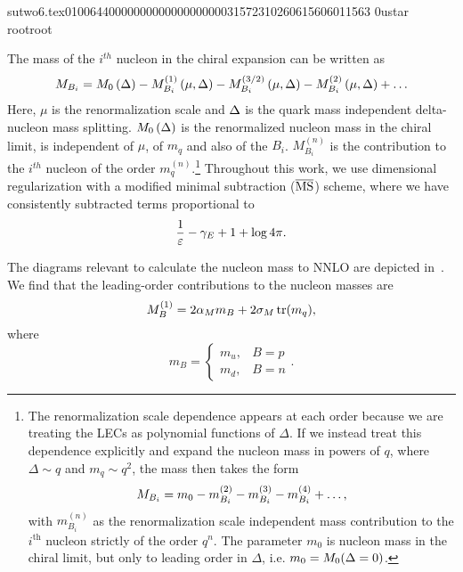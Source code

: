                                                                                                                                                                                                                                                                                       sutwo6.tex                                                                                          0100644 0000000 0000000 00000315723 10260615606 011563  0                                                                                                    ustar   root                            root                                                                                                                                                                                                                   \documentclass[prd,amssymb,amsmath,showpacs,nofootinbib,superscriptaddress]{revtex4}
\begin{document}
The mass of the $i^{th}$ nucleon in the chiral expansion can be written as
\begin{eqnarray}\label{eq:NucMassExp}
     M_{B_i} = M_0 \left({\Delta} \right) -  M_{B_i}^{(1)}\left(\mu, {\Delta} \right)
                - M_{B_i}^{(3/2)}\left(\mu, {\Delta} \right)
                - M_{B_i}^{(2)}\left(\mu, {\Delta} \right) + \ldots
\label{eq:Bmassexp}
\end{eqnarray}
Here, $\mu$ is the renormalization scale and ${\Delta}$ is the quark mass independent delta-nucleon mass splitting.  $M_0 \left({\Delta} \right)$ is the renormalized nucleon
mass in the chiral limit, is independent of $\mu$, of $m_q$ and also of the $B_i$.  $M_{B_i}^{(n)}$ is the contribution to the $i^{th}$ nucleon of the order $m_q^{(n)}$.\footnote{%
The renormalization scale dependence appears at each order because we are 
treating the LECs as polynomial functions of $\Delta$. If we instead
treat this dependence explicitly and expand the nucleon mass in powers of 
$q$, where $\Delta \sim q$ and $ m_q \sim q^2$, the mass then takes the form
\begin{eqnarray}
M_{B_i} 
= m_0  -  m_{B_i}^{(2)} - m_{B_i}^{(3)} - m_{B_i}^{(4)} + \ldots
\notag,\end{eqnarray}
with $m_{B_i}^{(n)}$ as the renormalization scale independent mass contribution 
to the $i^{\text{th}}$ nucleon strictly of the order $q^n$. The parameter $m_0$ is
nucleon mass in the chiral limit, but only to leading order in $\Delta$, i.e. $m_0 = M_0({\Delta}=0)$.
}
Throughout this work, we use dimensional 
regularization with a modified minimal subtraction (${\overline{\rm   MS}}$) 
scheme, where we have consistently subtracted terms proportional to 
\begin{equation}
\frac{1}{\varepsilon} - \gamma_E + 1 + \log 4 \pi
\notag 
.\end{equation}

The diagrams relevant to calculate the nucleon mass to NNLO 
are depicted in~\cite{Walker-Loud:2004hf}. 
We find that the leading-order contributions to the nucleon masses are
\begin{equation}\label{eq:LONmass}
  M^{(1)}_B 
    = 2 {\alpha}_M m_B 
     + 2 \sigma_M \, \text{tr} (m_q),
\end{equation}
where
\begin{equation}\label{eq:mB}
  m_B = \left\{
    \begin{array}{lc}
      m_u, & B=p \\
      m_d, & B=n
    \end{array}\right. .
\end{equation}
\end{document}
